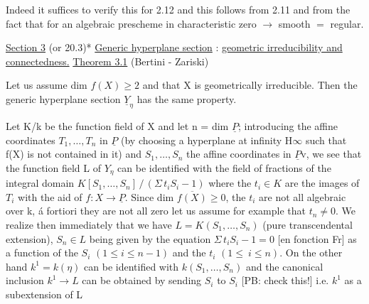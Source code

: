 
Indeed it suffices to verify this for 2.12 and this follows
from 2.11 and from the fact that for an algebraic prescheme in
characteristic zero $\rightarrow$ smooth $=$ regular.

\uline{Section 3} (or 20.3)*
\uline{Generic hyperplane section} : \uline{geometric irreducibility and}
\uline{connectedness.}
\uline{Theorem 3.1} (Bertini - Zariski)

Let us assume dim $f(X) \geq 2$ and that X is geometrically
irreducible. Then the generic hyperplane section $\underline{Y}_{\eta}$ has the same
property.

Let K/k be the function field of X and let n = dim $\underline{P}$;
introducing the affine coordinates $T_1,\dots,T_n$ in $\underline{P}$ (by choosing a
hyperplane at infinity H$\infty$ such that f(X) is not contained in it)
and $S_1,\dots,S_n$ the affine coordinates in $\underline{P}$v, we see that the
function field L of $Y_{\eta}$ can be identified with the field of
fractions of the integral domain $K[S_1,\dots,S_n] \,/\, (\Sigma\, t_iS_i - 1)$ where
the $t_i \in K$ are the images of $T_i$ with the aid of $f{:}X \rightarrow \underline{P}$. Since
dim $\overline{f(X)} \geq 0$, the $t_i$ are not all algebraic over k, á fortiori they
are not all zero let us assume for example that $t_n \neq 0$. We realize
then immediately that we have $L = K(S_1,\dots,S_n)$ (pure transcendental
extension), $S_n \in L$ being given by the equation $\Sigma\, t_iS_i - 1 = 0$
[en fonction Fr] as a function of the $S_i$ $(1 \leq i \leq n - 1)$ and the $t_i$
$(1 \leq\ i \leq n)$. On the other hand $k^1 = k(\eta)$ can be identified with
$k(S_1,\dots,S_n)$ and the canonical inclusion $k^1 \rightarrow L$ can be obtained by
sending $S_i$ to $S_i$ [PB: check this!] i.e. $k^1$ as a subextension of L

